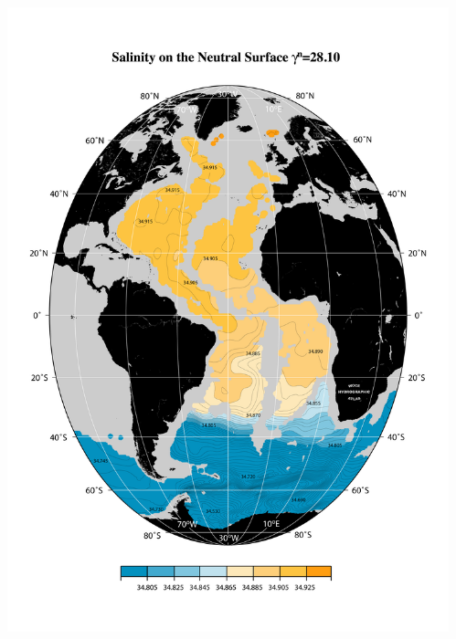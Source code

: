 \documentclass{beamer}
\begin{document}
\begin{frame}[plain,t]

    \begin{columns}
      \begin{column}{0.5\textwidth}
          \includegraphics[width=\textwidth]{salnty_isopyc_jpg/gam2810_sal.jpg}
       \end{column}
      \begin{column}{0.5\textwidth}

\end{column}
\end{columns}
\end{frame}
\end{document}

